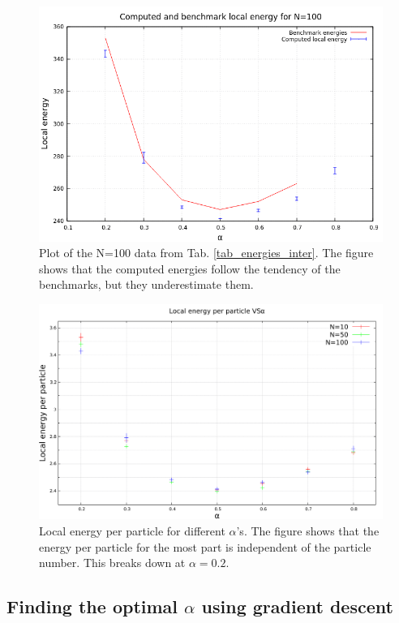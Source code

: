 \begin{figure}[H]
\centering
\includegraphics[scale = 0.8]{figures/compare_with_benchmark_100}
\caption{Plot of the N=100 data from Tab. \ref{tab_energies_inter}. The figure shows that the computed energies follow the tendency of the benchmarks, but they underestimate them.}
\label{fig_benchmark}
\end{figure}

\begin{figure}[H]
\centering
\centerline{\includegraphics[scale = 0.5]{figures/en_alfa}}
\caption{Local energy per particle for different $\alpha$'s. The figure shows that the energy per particle for the most part is independent of the particle number. This breaks down at $\alpha = 0.2$.}
\label{fig_en_alfa}
\end{figure}

\subsection{Finding the optimal $\alpha$ using gradient descent}

